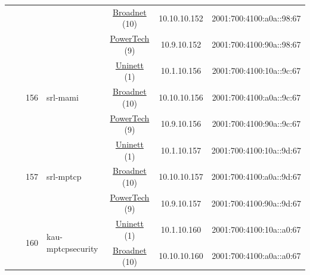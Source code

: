 \begin{small}
\begin{center}
\begin{longtable}{|c|c|c|c|c|c|c|c|}
  &  &  &  & \multicolumn{2}{|c|}{\tiny{\href{https://www.broadnet.no}{Broadnet} (10)}} & \tiny{10.10.10.152} & \tiny{2001:700:4100:a0a::98:67} \\* \cline{5-5}\cline{6-6}\cline{7-7}\cline{8-8}
  &  &  &  & \multicolumn{2}{|c|}{\tiny{\href{http://www.powertech.no}{PowerTech} (9)}} & \tiny{10.9.10.152} & \tiny{2001:700:4100:90a::98:67} \\* \cline{3-3}\cline{4-4}\cline{5-5}\cline{6-6}\cline{7-7}\cline{8-8}
  &  & \multirow{3}{*}{\tiny{156}} & \multicolumn{1}{|l|}{\multirow{3}{*}{\tiny{srl-mami}}} & \multicolumn{2}{|c|}{\tiny{\href{https://www.uninett.no}{Uninett} (1)}} & \tiny{10.1.10.156} & \tiny{2001:700:4100:10a::9c:67} \\* \cline{5-5}\cline{6-6}\cline{7-7}\cline{8-8}
  &  &  &  & \multicolumn{2}{|c|}{\tiny{\href{https://www.broadnet.no}{Broadnet} (10)}} & \tiny{10.10.10.156} & \tiny{2001:700:4100:a0a::9c:67} \\* \cline{5-5}\cline{6-6}\cline{7-7}\cline{8-8}
  &  &  &  & \multicolumn{2}{|c|}{\tiny{\href{http://www.powertech.no}{PowerTech} (9)}} & \tiny{10.9.10.156} & \tiny{2001:700:4100:90a::9c:67} \\* \cline{3-3}\cline{4-4}\cline{5-5}\cline{6-6}\cline{7-7}\cline{8-8}
  &  & \multirow{3}{*}{\tiny{157}} & \multicolumn{1}{|l|}{\multirow{3}{*}{\tiny{srl-mptcp}}} & \multicolumn{2}{|c|}{\tiny{\href{https://www.uninett.no}{Uninett} (1)}} & \tiny{10.1.10.157} & \tiny{2001:700:4100:10a::9d:67} \\* \cline{5-5}\cline{6-6}\cline{7-7}\cline{8-8}
  &  &  &  & \multicolumn{2}{|c|}{\tiny{\href{https://www.broadnet.no}{Broadnet} (10)}} & \tiny{10.10.10.157} & \tiny{2001:700:4100:a0a::9d:67} \\* \cline{5-5}\cline{6-6}\cline{7-7}\cline{8-8}
  &  &  &  & \multicolumn{2}{|c|}{\tiny{\href{http://www.powertech.no}{PowerTech} (9)}} & \tiny{10.9.10.157} & \tiny{2001:700:4100:90a::9d:67} \\* \cline{3-3}\cline{4-4}\cline{5-5}\cline{6-6}\cline{7-7}\cline{8-8}
  &  & \multirow{3}{*}{\tiny{160}} & \multicolumn{1}{|l|}{\multirow{3}{*}{\tiny{kau-mptcpsecurity}}} & \multicolumn{2}{|c|}{\tiny{\href{https://www.uninett.no}{Uninett} (1)}} & \tiny{10.1.10.160} & \tiny{2001:700:4100:10a::a0:67} \\* \cline{5-5}\cline{6-6}\cline{7-7}\cline{8-8}
  &  &  &  & \multicolumn{2}{|c|}{\tiny{\href{https://www.broadnet.no}{Broadnet} (10)}} & \tiny{10.10.10.160} & \tiny{2001:700:4100:a0a::a0:67} \\* \cline{5-5}\cline{6-6}\cline{7-7}\cline{8-8}

\end{longtable}
\end{center}
\end{small}
